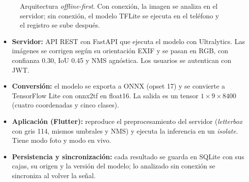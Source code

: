 \documentclass[sensors,article,submit,pdftex,moreauthors]{Definitions/mdpi}
\begin{document}
\begin{figure}[H]
\centering
{}
\caption{Arquitectura \emph{offline-first}. Con conexión, la imagen se analiza en el servidor; sin conexión, el modelo TFLite se ejecuta en el teléfono y el registro se sube después.\label{fig:arq}}
\end{figure}

\begin{itemize}[leftmargin=*,labelsep=4.9mm]
\item \textbf{Servidor:} API REST con FastAPI que ejecuta el modelo con Ultralytics. Las imágenes se corrigen según su orientación EXIF y se pasan en RGB, con confianza 0.30, IoU 0.45 y NMS agnóstica. Los usuarios se autentican con JWT.
\item \textbf{Conversión:} el modelo se exporta a ONNX (opset 17) y se convierte a TensorFlow Lite con onnx2tf en float16. La salida es un tensor $1\times9\times8400$ (cuatro coordenadas y cinco clases).
\item \textbf{Aplicación (Flutter):} reproduce el preprocesamiento del servidor (\emph{letterbox} con gris 114, mismos umbrales y NMS) y ejecuta la inferencia en un \emph{isolate}. Tiene modo foto y modo en vivo.
\item \textbf{Persistencia y sincronización:} cada resultado se guarda en SQLite con sus cajas, su origen y la versión del modelo; lo analizado sin conexión se sincroniza al volver la señal.
\end{itemize}
\end{document}
